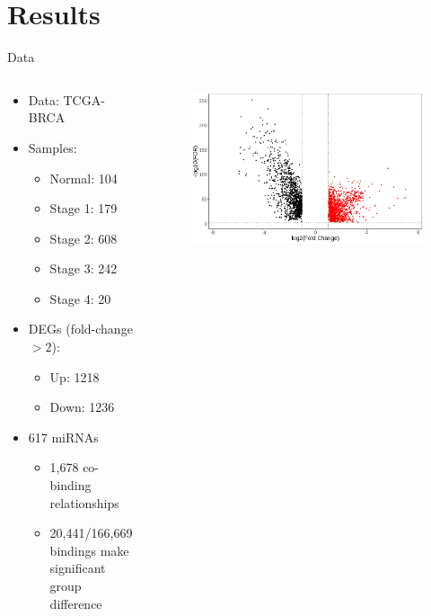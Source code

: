 \documentclass{beamer}
\begin{document}
\section{Results}
\begin{frame}{Data}
	\begin{columns}
		\begin{column}{.48\textwidth}
			\begin{itemize}
				\item Data: TCGA-BRCA
				\item Samples:
				      \begin{itemize}
					      \item Normal: 104
					      \item Stage 1: 179
					      \item Stage 2: 608
					      \item Stage 3: 242
					      \item Stage 4: 20
				      \end{itemize}
				\item DEGs (fold-change $> 2$):
				      \begin{itemize}
					      \item Up: 1218
					      \item Down: 1236
				      \end{itemize}
				\item 617 miRNAs
				      \begin{itemize}
					      \item 1,678 co-binding relationships
					      \item 20,441/166,669 bindings make significant group difference
				      \end{itemize}
			\end{itemize}
		\end{column}

		\begin{column}{.48\textwidth}
			\begin{figure}[ht]
				\centering
				\includegraphics[width=1\textwidth, height=0.7\textheight]{figures/diff-genes-volcano.png}
				\caption*{\label{fig:volcano}}
			\end{figure}
		\end{column}
	\end{columns}
\end{frame}
\end{document}

